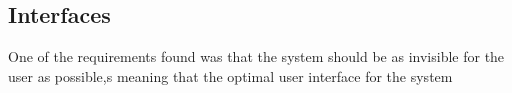 \subsection{Interfaces}
One of the requirements found was that the system should be as invisible for the user as possible,s meaning that the optimal user interface for the system
